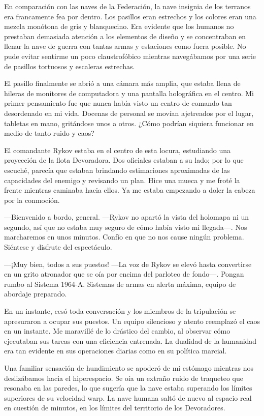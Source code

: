 En comparación con las naves de la Federación, la nave insignia de los terranos era francamente fea por dentro. Los pasillos eran estrechos y los colores eran una mezcla monótona de gris y blanquecino. Era evidente que los humanos no prestaban demasiada atención a los elementos de diseño y se concentraban en llenar la nave de guerra con tantas armas y estaciones como fuera posible. No pude evitar sentirme un poco claustrofóbico mientras navegábamos por una serie de pasillos tortuosos y escaleras estrechas.

El pasillo finalmente se abrió a una cámara más amplia, que estaba llena de hileras de monitores de computadora y una pantalla holográfica en el centro. Mi primer pensamiento fue que nunca había visto un centro de comando tan desordenado en mi vida. Docenas de personal se movían ajetreados por el lugar, tabletas en mano, gritándose unos a otros. ¿Cómo podrían siquiera funcionar en medio de tanto ruido y caos?

El comandante Rykov estaba en el centro de esta locura, estudiando una proyección de la flota Devoradora. Dos oficiales estaban a su lado; por lo que escuché, parecía que estaban brindando estimaciones aproximadas de las capacidades del enemigo y revisando un plan. Hice una mueca y me froté la frente mientras caminaba hacia ellos. Ya me estaba empezando a doler la cabeza por la conmoción.

—Bienvenido a bordo, general. —Rykov no apartó la vista del holomapa ni un segundo, así que no estaba muy seguro de cómo había visto mi llegada—. Nos marcharemos en unos minutos. Confío en que no nos cause ningún problema. Siéntese y disfrute del espectáculo.

—¡Muy bien, todos a sus puestos! —La voz de Rykov se elevó hasta convertirse en un grito atronador que se oía por encima del parloteo de fondo—. Pongan rumbo al Sistema 1964-A. Sistemas de armas en alerta máxima, equipo de abordaje preparado.

En un instante, cesó toda conversación y los miembros de la tripulación se apresuraron a ocupar sus puestos. Un equipo silencioso y atento reemplazó el caos en un instante. Me maravillé de lo drástico del cambio, al observar cómo ejecutaban sus tareas con una eficiencia entrenada. La dualidad de la humanidad era tan evidente en sus operaciones diarias como en su política marcial.

Una familiar sensación de hundimiento se apoderó de mi estómago mientras nos deslizábamos hacia el hiperespacio. Se oía un extraño ruido de traqueteo que resonaba en las paredes, lo que sugería que la nave estaba superando los límites superiores de su velocidad warp. La nave humana saltó de nuevo al espacio real en cuestión de minutos, en los límites del territorio de los Devoradores.


